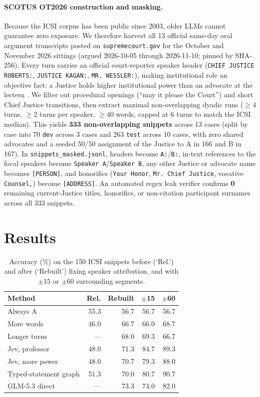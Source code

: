 \documentclass[11pt]{article}
\begin{document}
\paragraph{SCOTUS OT2026 construction and masking.}
Because the ICSI corpus has been public since 2003, older LLMs cannot guarantee zero exposure.
We therefore harvest all 13 official same-day oral argument transcripts posted on \texttt{supremecourt.gov} for the October and November 2026 sittings (argued 2026-10-05 through 2026-11-10; pinned by SHA-256).
Every turn carries an official court-reporter speaker header (\texttt{CHIEF JUSTICE ROBERTS:}, \texttt{JUSTICE KAGAN:}, \texttt{MR.\ WESSLER:}), making institutional role an objective fact: a Justice holds higher institutional power than an advocate at the lectern \citep{danescu2012echoes}.
We filter out procedural openings (``may it please the Court'') and short Chief Justice transitions, then extract maximal non-overlapping dyadic runs ($\ge 4$ turns, $\ge 2$ turns per speaker, $\ge 40$ words, capped at 6 turns to match the ICSI median).
This yields \textbf{333 non-overlapping snippets} across 13 cases (split by case into 70 \texttt{dev} across 3 cases and 263 \texttt{test} across 10 cases, with zero shared advocates and a seeded 50/50 assignment of the Justice to A in 166 and B in 167).
In \texttt{snippets\_masked.jsonl}, headers become \texttt{A:}/\texttt{B:}, in-text references to the focal speakers become \texttt{Speaker A}/\texttt{Speaker B}, any other Justice or advocate name becomes \texttt{[PERSON]}, and honorifics (\texttt{Your Honor}, \texttt{Mr.\ Chief Justice}, vocative \texttt{Counsel,}) become \texttt{[ADDRESS]}.
An automated regex leak verifier confirms \textbf{0} remaining current-Justice titles, honorifics, or non-citation participant surnames across all 333 snippets.

\section{Results}
\label{sec:results}

\begin{table}[t]
\centering\small
\setlength{\tabcolsep}{3.5pt}
\begin{tabular}{lrrrr}
\toprule
Method & Rel. & Rebuilt & $\pm$15 & $\pm$60 \\
\midrule
Always A & 55.3 & 56.7 & 56.7 & 56.7 \\
More words & 46.0 & 66.7 & 66.0 & 68.7 \\
Longer turns & --- & 68.0 & 69.3 & 66.7 \\
Jev, professor & 48.0 & 71.3 & 84.7 & 89.3 \\
Jev, more power & 48.0 & 70.7 & 79.3 & 88.0 \\
Typed-statement graph & 51.3 & 70.0 & 80.7 & 90.7 \\
GLM-5.3 direct & --- & 73.3 & 74.0 & 82.0 \\
\bottomrule
\end{tabular}
\caption{Accuracy (\%) on the 150 ICSI snippets before (`Rel.') and after (`Rebuilt') fixing speaker attribution, and with $\pm 15$ or $\pm 60$ surrounding segments.}
\label{tab:rebuilt}
\end{table}
\end{document}
